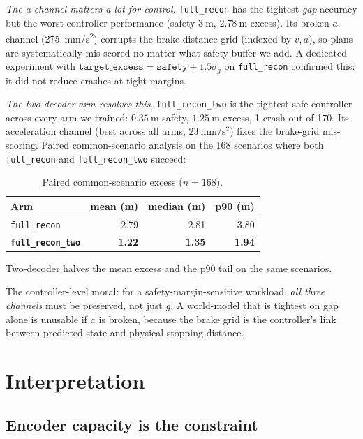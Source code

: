 \documentclass[11pt,a4paper]{article}
\begin{document}
\emph{The a-channel matters a lot for control.} \texttt{full\_recon} has the
tightest \emph{gap} accuracy but the worst controller performance
(safety $\SI{3}{\m}$, $\SI{2.78}{\m}$ excess). Its broken $a$-channel
(\SI{275}{\mm/\s^2}) corrupts the brake-distance grid (indexed by $v, a$),
so plans are systematically mis-scored no matter what safety buffer we add.
A dedicated experiment with $\texttt{target\_excess} = \texttt{safety} + 1.5\sigma_g$
on \texttt{full\_recon} confirmed this: it did not reduce crashes at tight
margins.

\emph{The two-decoder arm resolves this.} \texttt{full\_recon\_two} is the
tightest-safe controller across every arm we trained: $\SI{0.35}{\m}$ safety,
$\SI{1.25}{\m}$ excess, 1 crash out of 170. Its acceleration channel (best
across all arms, $\SI{23}{\mm/\s^2}$) fixes the brake-grid mis-scoring.
Paired common-scenario analysis on the 168 scenarios where both
\texttt{full\_recon} and \texttt{full\_recon\_two} succeed:

\begin{table}[h]
\centering
\small
\caption{Paired common-scenario excess ($n{=}168$).}
\label{tab:paired}
\begin{tabular}{lrrr}
\toprule
Arm & mean (m) & median (m) & p90 (m) \\
\midrule
\texttt{full\_recon}                     & 2.79 & 2.81 & 3.80 \\
\textbf{\texttt{full\_recon\_two}}       & \textbf{1.22} & \textbf{1.35} & \textbf{1.94} \\
\bottomrule
\end{tabular}
\end{table}

Two-decoder halves the mean excess and the p90 tail on the same scenarios.

The controller-level moral: for a safety-margin-sensitive workload, \emph{all
three channels} must be preserved, not just $g$. A world-model that is
tightest on gap alone is unusable if $a$ is broken, because the brake grid is
the controller's link between predicted state and physical stopping distance.

\section{Interpretation}

\subsection{Encoder capacity is the constraint}
\end{document}

